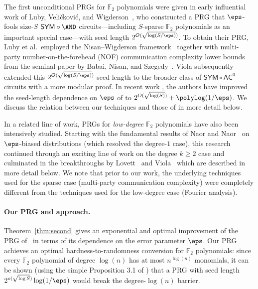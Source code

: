 \documentclass{toc}
\theoremstyle{plain}
\newcommand{\acz}{\mathsf{AC^0}}
\newcommand{\SYM}{\mathsf{SYM}}
\renewcommand{\F}{\mathds{F}}
\begin{document}
The first unconditional PRGs for $\F_2$ polynomials were given in early influential work of Luby, Veli{\v{c}}kovi{\'c}, and Wigderson~\cite{LVW93}, who constructed a PRG that $\eps$-fools size-$S$ $\SYM \circ \AND$ circuits---including $S$-sparse $\F_2$ polynomials as an important special case---with seed length $2^{O(\sqrt{\log (S/\eps)})}$.  To obtain their PRG, Luby et al.~employed the Nisan--Wigderson framework~\cite{NW94} together with multi-party number-on-the-forehead (NOF) communication complexity lower bounds from the seminal
%
paper by  %
Babai, Nisan, and Szegedy~\cite{BNS92}. Viola \cite{Vio06} subsequently extended this $2^{O(\sqrt{\log (S/\eps)})}$ seed length to the broader class of $\SYM \circ \acz$ circuits with a more modular proof.  
In recent work \cite{ST18}, the authors have improved the
%
seed-length   %
dependence on $\eps$ of \cite{LVW93,Vio06} to $2^{O(\sqrt{\log (S)})} + \polylog(1/\eps)$.  We discuss the relation between our techniques and those of \cite{ST18} in more detail below.



In a related line of work, PRGs for \emph{low-degree} $\F_2$ polynomials have also been intensively studied.  Starting with the fundamental results of Naor and Naor~\cite{NN93} on $\eps$-biased distributions (which resolved the degree-$1$ case), this research continued through an exciting line of work on the degree $k \ge 2$ case \cite{Bog05,BV10} and culminated in the breakthroughs %
by  %
Lovett~\cite{Lov09} and Viola~\cite{Vio09} which are described in more detail below.
We note that prior to our work, the underlying techniques used for the sparse case (multi-party communication complexity) were completely different from the techniques used for the low-degree case (Fourier analysis).

\vspace{-5pt} 
\paragraph{Our PRG and approach.} Theorem~\ref{thm:second} gives an exponential and optimal improvement of the PRG of~\cite{LVW93} in terms of its dependence on the error parameter $\eps$. Our PRG  achieves an optimal %
hardness-to-randomness   %
conversion for $\F_2$ polynomials: since every
%
%
%
$\F_2$ polynomial
of degree $\log(n)$   %
has at most $n^{\log(n)}$ monomials, it can be shown (using the simple Proposition 3.1 of \cite{Vio09}) that a PRG with seed length $2^{o(\sqrt{\log S})}\log(1/\eps)$ would break the 
degree-$\log(n)$ barrier. %
\end{document}
